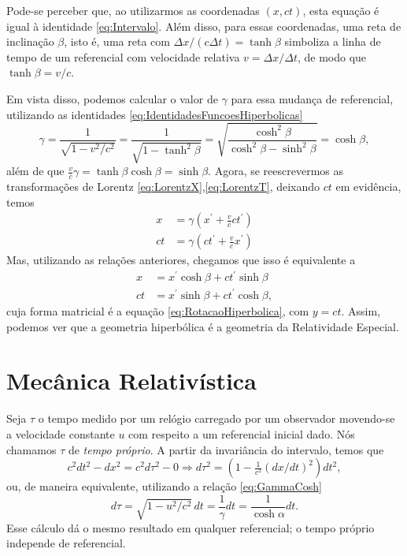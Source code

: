 Pode-se perceber que, ao utilizarmos as coordenadas $(x,ct)$, esta equação é igual à identidade \eqref{eq:Intervalo}. Além disso, para essas coordenadas, uma reta de inclinação $\beta$, isto é, uma reta com $\Delta x/(c\Delta t)=\tanh\beta$ simboliza a linha de tempo de um referencial com velocidade relativa $v = \Delta x/\Delta t$, de modo que $\tanh\beta=v/c$.

Em vista disso, podemos calcular o valor de $\gamma$ para essa mudança de referencial, utilizando as identidades \eqref{eq:IdentidadesFuncoesHiperbolicas}
\begin{equation}\label{eq:GammaCosh}
    \gamma = \frac{1}{\sqrt{1-v^2/c^2}}=\frac{1}{\sqrt{1-\tanh^2\beta}}
    =\sqrt{\frac{\cosh^2\beta}{\cosh^2\beta-\sinh^2\beta}}=\cosh\beta ,
\end{equation}
além de que $\tfrac{v}{c}\gamma = \tanh\beta\cosh\beta=\sinh\beta$. Agora, se reescrevermos as transformações de Lorentz \eqref{eq:LorentzX},\eqref{eq:LorentzT}, deixando $ct$ em evidência, temos
\begin{equation}
\begin{aligned} x &=\gamma\left(x^{\prime}+\frac{v}{c} c t^{\prime}\right) \\ c t &=\gamma\left(c t^{\prime}+\frac{v}{c} x^{\prime}\right) \end{aligned}
\end{equation}
Mas, utilizando as relações anteriores, chegamos que isso é equivalente a
\begin{equation}
\begin{aligned} x &=x^{\prime} \cosh \beta+c t^{\prime} \sinh \beta \\ c t &=x^{\prime} \sinh \beta+c t^{\prime} \cosh \beta ,\end{aligned}
\end{equation}
cuja forma matricial é a equação \eqref{eq:RotacaoHiperbolica}, com $y=ct$. Assim, podemos ver que a geometria hiperbólica é a geometria da Relatividade Especial.

\section{Mecânica Relativística}
Seja $\tau$ o tempo medido por um relógio carregado por um observador movendo-se a velocidade constante $u$ com respeito a um referencial inicial    dado. Nós chamamos $\tau$ de \textit{tempo próprio}. A partir da invariância do intervalo, temos que
\[
  c^2dt^2-dx^2=c^2d\tau^2 -0 \Rightarrow d\tau^2 =  
  \left( 1-\tfrac{1}{c^2}\left( dx/dt \right)^2 \right)dt^2,
\]
ou, de maneira equivalente, utilizando a relação \eqref{eq:GammaCosh}
\[
    d\tau = \sqrt{1-u^2/c^2} \,dt = \frac{1}{\gamma}dt= \frac{1}{\cosh\alpha}dt.
\]
Esse cálculo dá o mesmo resultado em qualquer referencial; o tempo próprio independe de referencial.

